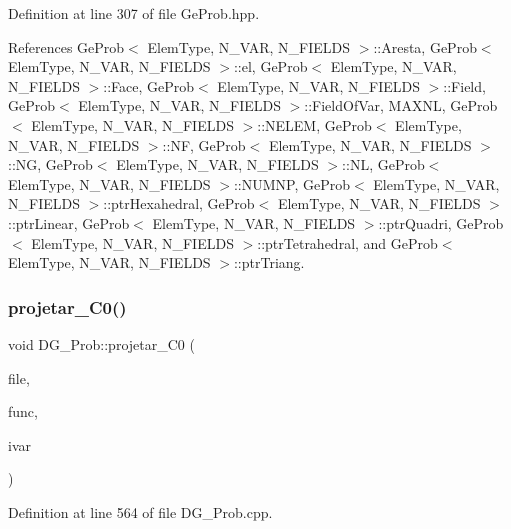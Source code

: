 Definition at line 307 of file Ge\+Prob.\+hpp.



References Ge\+Prob$<$ Elem\+Type, N\+\_\+\+V\+A\+R, N\+\_\+\+F\+I\+E\+L\+D\+S $>$\+::\+Aresta, Ge\+Prob$<$ Elem\+Type, N\+\_\+\+V\+A\+R, N\+\_\+\+F\+I\+E\+L\+D\+S $>$\+::el, Ge\+Prob$<$ Elem\+Type, N\+\_\+\+V\+A\+R, N\+\_\+\+F\+I\+E\+L\+D\+S $>$\+::\+Face, Ge\+Prob$<$ Elem\+Type, N\+\_\+\+V\+A\+R, N\+\_\+\+F\+I\+E\+L\+D\+S $>$\+::\+Field, Ge\+Prob$<$ Elem\+Type, N\+\_\+\+V\+A\+R, N\+\_\+\+F\+I\+E\+L\+D\+S $>$\+::\+Field\+Of\+Var, M\+A\+X\+NL, Ge\+Prob$<$ Elem\+Type, N\+\_\+\+V\+A\+R, N\+\_\+\+F\+I\+E\+L\+D\+S $>$\+::\+N\+E\+L\+EM, Ge\+Prob$<$ Elem\+Type, N\+\_\+\+V\+A\+R, N\+\_\+\+F\+I\+E\+L\+D\+S $>$\+::\+NF, Ge\+Prob$<$ Elem\+Type, N\+\_\+\+V\+A\+R, N\+\_\+\+F\+I\+E\+L\+D\+S $>$\+::\+NG, Ge\+Prob$<$ Elem\+Type, N\+\_\+\+V\+A\+R, N\+\_\+\+F\+I\+E\+L\+D\+S $>$\+::\+NL, Ge\+Prob$<$ Elem\+Type, N\+\_\+\+V\+A\+R, N\+\_\+\+F\+I\+E\+L\+D\+S $>$\+::\+N\+U\+M\+NP, Ge\+Prob$<$ Elem\+Type, N\+\_\+\+V\+A\+R, N\+\_\+\+F\+I\+E\+L\+D\+S $>$\+::ptr\+Hexahedral, Ge\+Prob$<$ Elem\+Type, N\+\_\+\+V\+A\+R, N\+\_\+\+F\+I\+E\+L\+D\+S $>$\+::ptr\+Linear, Ge\+Prob$<$ Elem\+Type, N\+\_\+\+V\+A\+R, N\+\_\+\+F\+I\+E\+L\+D\+S $>$\+::ptr\+Quadri, Ge\+Prob$<$ Elem\+Type, N\+\_\+\+V\+A\+R, N\+\_\+\+F\+I\+E\+L\+D\+S $>$\+::ptr\+Tetrahedral, and Ge\+Prob$<$ Elem\+Type, N\+\_\+\+V\+A\+R, N\+\_\+\+F\+I\+E\+L\+D\+S $>$\+::ptr\+Triang.

\mbox{\label{classDG__Prob_acbf4eefc45872a673a1491b776921d31}} 
\subsubsection{\texorpdfstring{projetar\+\_\+\+C0()}{projetar\_C0()}}
{\footnotesize\ttfamily void D\+G\+\_\+\+Prob\+::projetar\+\_\+\+C0 (\begin{DoxyParamCaption}\item[{F\+I\+LE $\ast$}]{file,  }\item[{double($\ast$)(double, double, double)}]{func,  }\item[{const int \&}]{ivar }\end{DoxyParamCaption})}



Definition at line 564 of file D\+G\+\_\+\+Prob.\+cpp.



